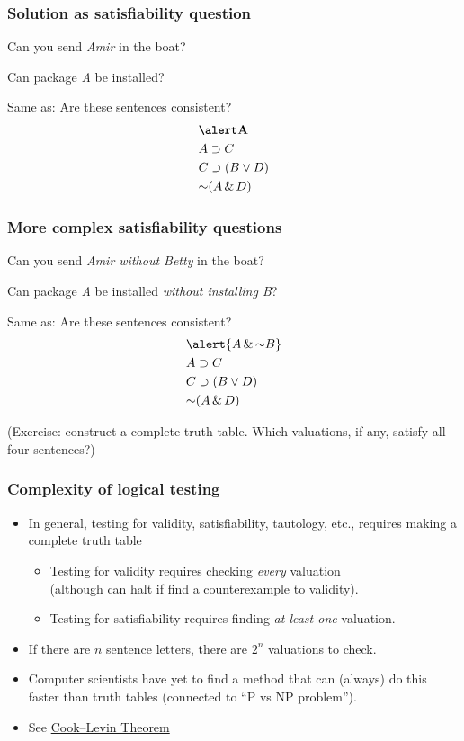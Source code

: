 \begin{frame}
\frametitle{Solution as satisfiability question}

Can you send \emph{Amir} in the boat?

Can package \emph{A} be installed?

Same as: Are these sentences consistent?
\begin{align*}
& \emph{A}\\
& A \eif C\\
& C \eif (B \eor D) \\
& \enot (A \eand D)
\end{align*}
\end{frame}

\begin{frame}
  \frametitle{More complex satisfiability questions}
  
  Can you send \emph{Amir without Betty} in the boat?
  
  Can package \emph{A} be installed \emph{without installing B}?
  
  Same as: Are these sentences consistent?
  \begin{align*}
  & \alert{A \eand \enot B}\\
  & A \eif C\\
  & C \eif (B \eor D) \\
  & \enot (A \eand D)
  \end{align*}
  
  (Exercise: construct a complete truth table. Which valuations, if any,
  satisfy all four sentences?)
  \end{frame}
  
\begin{frame}
\frametitle{Complexity of logical testing}

\begin{itemize}[<+->]
\item In general, testing for validity, satisfiability, tautology, etc., requires
making a complete truth table
\begin{itemize}
\item Testing for validity requires checking \emph{every} valuation \\ (although can halt if find a counterexample to validity).
\item Testing for satisfiability requires finding \emph{at least one} valuation.
\end{itemize}
\item If there are $n$ sentence letters, there are $2^n$ valuations to
check.
\item Computer scientists have yet to find a method that can (always) do this
faster than truth tables (connected to ``P vs NP problem'').

\item See \href{https://en.wikipedia.org/wiki/Cook–Levin_theorem}{Cook--Levin Theorem}
\end{itemize}
\end{frame}

